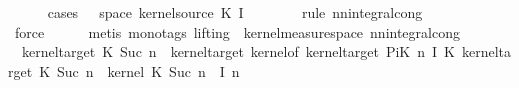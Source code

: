 \begin{isabellebody}
\ \ \ \ \isamarkupfalse%
\ {\isacharparenleft}{\kern0pt}cases\ {\isachardoublequoteopen}{\isasymomega}\ {\isasymin}\ space\ {\isacharparenleft}{\kern0pt}kernel{\isacharunderscore}{\kern0pt}source\ {\isacharparenleft}{\kern0pt}K\ {\isacharparenleft}{\kern0pt}I\ {}{\isacharparenright}{\kern0pt}{\isacharparenright}{\kern0pt}{\isacharparenright}{\kern0pt}{\isachardoublequoteclose}{\isacharparenright}{\kern0pt}\isanewline
\ \ \ \ \ \isamarkupfalse%
\ {\isacharparenleft}{\kern0pt}rule\ nn{\isacharunderscore}{\kern0pt}integral{\isacharunderscore}{\kern0pt}cong{\isacharparenright}{\kern0pt}\isanewline
\ \ \ \ \isamarkupfalse%
\ {}\ \isamarkupfalse%
\ force\isanewline
\ \ \ \ \isamarkupfalse%
\ {\isacharparenleft}{\kern0pt}metis\ {\isacharparenleft}{\kern0pt}mono{\isacharunderscore}{\kern0pt}tags{\isacharcomma}{\kern0pt}\ lifting{\isacharparenright}{\kern0pt}\ {\isachardoublequoteopen}{}{\isachardoublequoteclose}\ kernel{\isacharunderscore}{\kern0pt}measure{\isacharunderscore}{\kern0pt}space\ nn{\isacharunderscore}{\kern0pt}integral{\isacharunderscore}{\kern0pt}cong{\isacharparenright}{\kern0pt}\isanewline
\ \ \isamarkupfalse%
\ {}{\isacharcolon}{\kern0pt}\ {\isachardoublequoteopen}kernel{\isacharunderscore}{\kern0pt}target\ {\isacharparenleft}{\kern0pt}{\isacharquery}{\kern0pt}K\ {\isacharparenleft}{\kern0pt}Suc\ n{\isacharparenright}{\kern0pt}{\isacharparenright}{\kern0pt}\ {\isacharequal}{\kern0pt}\ kernel{\isacharunderscore}{\kern0pt}target\ {\isacharparenleft}{\kern0pt}kernel{\isacharunderscore}{\kern0pt}of\ {\isacharparenleft}{\kern0pt}kernel{\isacharunderscore}{\kern0pt}target\ {\isacharparenleft}{\kern0pt}PiK\ n\ I\ K{\isacharparenright}{\kern0pt}{\isacharparenright}{\kern0pt}\ {\isacharparenleft}{\kern0pt}kernel{\isacharunderscore}{\kern0pt}target\ {\isacharparenleft}{\kern0pt}{\isacharquery}{\kern0pt}K\ {\isacharparenleft}{\kern0pt}Suc\ n{\isacharparenright}{\kern0pt}{\isacharparenright}{\kern0pt}{\isacharparenright}{\kern0pt}\ {\isacharparenleft}{\kern0pt}{\isasymlambda}{\isasymomega}{\isachardot}{\kern0pt}\ kernel\ {\isacharparenleft}{\kern0pt}{\isacharquery}{\kern0pt}K\ {\isacharparenleft}{\kern0pt}Suc\ n{\isacharparenright}{\kern0pt}{\isacharparenright}{\kern0pt}\ {\isacharparenleft}{\kern0pt}{\isasymomega}\ {\isacharparenleft}{\kern0pt}I\ n{\isacharparenright}{\kern0pt}{\isacharparenright}{\kern0pt}{\isacharparenright}{\kern0pt}{\isacharparenright}{\kern0pt}{\isachardoublequoteclose}\isanewline
\ \ \ \ \isamarkupfalse%

\end{isabellebody}
